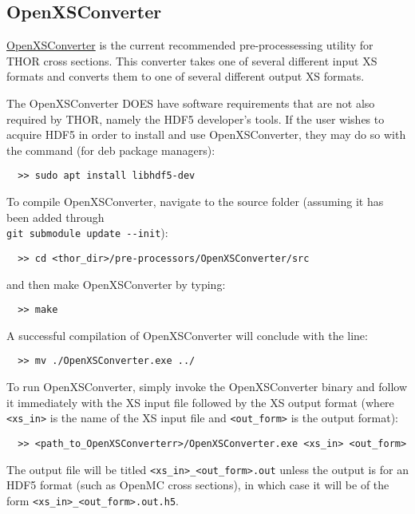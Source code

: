 \subsection{OpenXSConverter}\label{ch:getstart:sec:preproc:subsec:xsconv}

\href{https://github.com/nfherrin/OpenXSConverter}{OpenXSConverter} is the current recommended pre-processessing utility for \ac{THOR} cross sections.
This converter takes one of several different input \ac{XS} formats and converts them to one of several different output \ac{XS} formats.

The OpenXSConverter DOES have software requirements that are not also required by \ac{THOR}, namely the HDF5 developer's tools.
If the user wishes to acquire HDF5 in order to install and use OpenXSConverter, they may do so with the command (for deb package managers):
\begin{verbatim}
  >> sudo apt install libhdf5-dev
\end{verbatim}
To compile OpenXSConverter, navigate to the source folder (assuming it has been added through \\
\verb"git submodule update --init"):
\begin{verbatim}
  >> cd <thor_dir>/pre-processors/OpenXSConverter/src
\end{verbatim}
and then make OpenXSConverter by typing:
\begin{verbatim}
  >> make
\end{verbatim}
A successful compilation of OpenXSConverter will conclude with the line:
\begin{verbatim}
  >> mv ./OpenXSConverter.exe ../
\end{verbatim}

To run OpenXSConverter, simply invoke the OpenXSConverter binary and follow it immediately with the XS input file followed by the XS output format (where \verb"<xs_in>" is the name of the XS input file and \verb"<out_form>" is the output format):
\begin{verbatim}
  >> <path_to_OpenXSConverterr>/OpenXSConverter.exe <xs_in> <out_form>
\end{verbatim}
The output file will be titled \verb"<xs_in>_<out_form>.out" unless the output is for an HDF5 format (such as OpenMC cross sections), in which case it will be of the form \verb"<xs_in>_<out_form>.out.h5".

